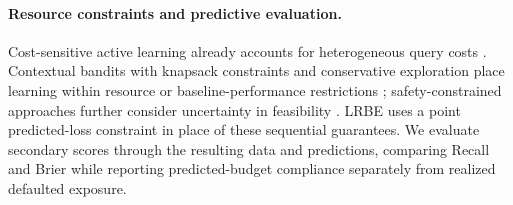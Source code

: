 \paragraph{Resource constraints and predictive evaluation.}
Cost-sensitive active learning already accounts for heterogeneous query costs \cite{donmez2008proactive,tomanek2010cost}. Contextual bandits with knapsack constraints and conservative exploration place learning within resource or baseline-performance restrictions \cite{agrawal2016knapsacks,wu2016conservative}; safety-constrained approaches further consider uncertainty in feasibility \cite{amani2019safe,pacchiano2021linearconstraints}. LRBE uses a point predicted-loss constraint in place of these sequential guarantees. We evaluate secondary scores through the resulting data and predictions, comparing Recall and Brier while reporting predicted-budget compliance separately from realized defaulted exposure.
